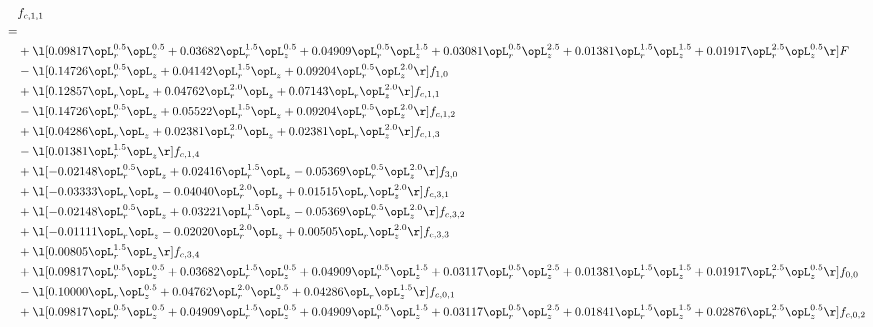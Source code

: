 \begin{alignat}{2} 
\label{eq:f_11_1} 
& f_{c,1,1} \nonumber \\ 
 = \\ 
& + \l[  0.09817 \opL_r^{0.5} \opL_z^{0.5} +  0.03682 \opL_r^{1.5} \opL_z^{0.5} +  0.04909 \opL_r^{0.5} \opL_z^{1.5} +  0.03081 \opL_r^{0.5} \opL_z^{2.5} +  0.01381 \opL_r^{1.5} \opL_z^{1.5} +  0.01917 \opL_r^{2.5} \opL_z^{0.5}  \r] F \nonumber \\ 
& - \l[  0.14726 \opL_r^{0.5} \opL_z +  0.04142 \opL_r^{1.5} \opL_z +  0.09204 \opL_r^{0.5} \opL_z^{2.0}  \r] f_{1,0} \nonumber \\ 
& + \l[  0.12857 \opL_r \opL_z +  0.04762 \opL_r^{2.0} \opL_z +  0.07143 \opL_r \opL_z^{2.0}  \r] f_{c,1,1} \nonumber \\ 
& - \l[  0.14726 \opL_r^{0.5} \opL_z +  0.05522 \opL_r^{1.5} \opL_z +  0.09204 \opL_r^{0.5} \opL_z^{2.0}  \r] f_{c,1,2} \nonumber \\ 
& + \l[  0.04286 \opL_r \opL_z +  0.02381 \opL_r^{2.0} \opL_z +  0.02381 \opL_r \opL_z^{2.0}  \r] f_{c,1,3} \nonumber \\ 
& - \l[  0.01381 \opL_r^{1.5} \opL_z  \r] f_{c,1,4} \nonumber \\ 
& + \l[  -0.02148 \opL_r^{0.5} \opL_z +  0.02416 \opL_r^{1.5} \opL_z   -0.05369 \opL_r^{0.5} \opL_z^{2.0}  \r] f_{3,0} \nonumber \\ 
& + \l[  -0.03333 \opL_r \opL_z   -0.04040 \opL_r^{2.0} \opL_z +  0.01515 \opL_r \opL_z^{2.0}  \r] f_{c,3,1} \nonumber \\ 
& + \l[  -0.02148 \opL_r^{0.5} \opL_z +  0.03221 \opL_r^{1.5} \opL_z   -0.05369 \opL_r^{0.5} \opL_z^{2.0}  \r] f_{c,3,2} \nonumber \\ 
& + \l[  -0.01111 \opL_r \opL_z   -0.02020 \opL_r^{2.0} \opL_z +  0.00505 \opL_r \opL_z^{2.0}  \r] f_{c,3,3} \nonumber \\ 
& + \l[  0.00805 \opL_r^{1.5} \opL_z  \r] f_{c,3,4} \nonumber \\ 
& + \l[  0.09817 \opL_r^{0.5} \opL_z^{0.5} +  0.03682 \opL_r^{1.5} \opL_z^{0.5} +  0.04909 \opL_r^{0.5} \opL_z^{1.5} +  0.03117 \opL_r^{0.5} \opL_z^{2.5} +  0.01381 \opL_r^{1.5} \opL_z^{1.5} +  0.01917 \opL_r^{2.5} \opL_z^{0.5}  \r] f_{0,0} \nonumber \\ 
& - \l[  0.10000 \opL_r \opL_z^{0.5} +  0.04762 \opL_r^{2.0} \opL_z^{0.5} +  0.04286 \opL_r \opL_z^{1.5}  \r] f_{c,0,1} \nonumber \\ 
& + \l[  0.09817 \opL_r^{0.5} \opL_z^{0.5} +  0.04909 \opL_r^{1.5} \opL_z^{0.5} +  0.04909 \opL_r^{0.5} \opL_z^{1.5} +  0.03117 \opL_r^{0.5} \opL_z^{2.5} +  0.01841 \opL_r^{1.5} \opL_z^{1.5} +  0.02876 \opL_r^{2.5} \opL_z^{0.5}  \r] f_{c,0,2} \nonumber \\ 

\end{alignat}
